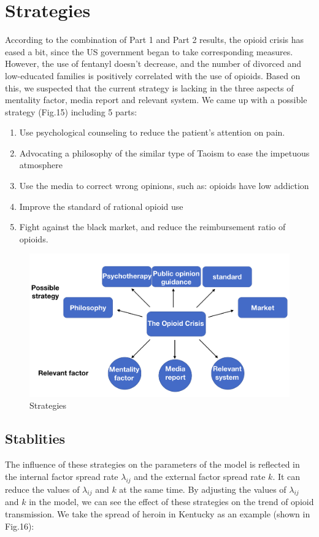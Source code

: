 \documentclass[12pt]{article}
\begin{document}
\section{Strategies}
According to the combination of  Part 1 and Part 2 results, the opioid crisis has eased a bit, since the US government began to take corresponding measures. However, the use of fentanyl doesn't decrease, and the number of divorced and low-educated families is positively correlated with the use of opioids. Based on this, we suspected that the current strategy is lacking in the three aspects of mentality factor, media report and relevant system. We came up with a possible strategy (Fig.15) including 5 parts: 
\begin{enumerate}[\bfseries (1)]
    \item Use psychological counseling to reduce the patient's attention on pain. 
    \item Advocating a philosophy of the similar type of Taoism to ease the impetuous atmosphere 
    \item Use the media to correct wrong opinions, such as: opioids have low addiction 
    \item Improve the standard of rational opioid use
    \item Fight against the black market, and reduce the reimbursement ratio of opioids.
 \end{enumerate}

\begin{figure}[!htbp]
\small
\centering
\includegraphics[width=12cm]{Fig/str.png}
\caption{Strategies}
\end{figure}

\subsection{Stablities}
The influence of these strategies on the parameters of the model is reflected in the internal factor spread rate $\lambda_{ij}$ and the external factor spread rate $k$. It can reduce the values of $\lambda_{ij}$ and $k$ at the same time. By adjusting the values of $\lambda_{ij}$ and $k$ in the model, we can see the effect of these strategies on the trend of opioid transmission. We take the spread of heroin in Kentucky as an example (shown in Fig.16):
\end{document}
